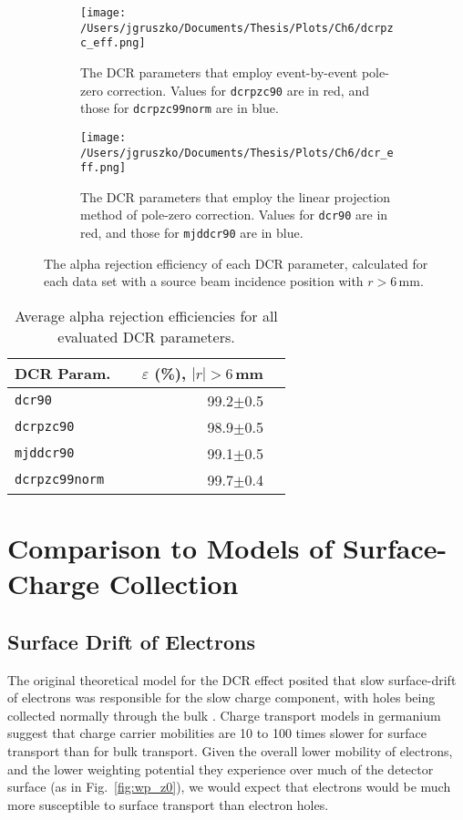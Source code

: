 \begin{figure*}[]
 \centering
 \begin{subfigure}[]{\textwidth}
 \centering
 \texttt{[image: /Users/jgruszko/Documents/Thesis/Plots/Ch6/dcrpzc\_eff.png]}
 \caption{The DCR parameters that employ event-by-event pole-zero correction. Values for {\tt dcrpzc90} are in red, and those for {\tt dcrpzc99norm} are in blue.} 
 \end{subfigure}
 \hfill
  \begin{subfigure}[]{\textwidth}
  \centering
 \texttt{[image: /Users/jgruszko/Documents/Thesis/Plots/Ch6/dcr\_eff.png]}
 \caption{The DCR parameters that employ the linear projection method of pole-zero correction. Values for {\tt dcr90} are in red, and those for {\tt mjddcr90} are in blue.} 
 \end{subfigure}
 \caption[The alpha rejection efficiency as a function of radius for each DCR parameter]{The alpha rejection efficiency of each DCR parameter, calculated for each data set with a source beam incidence position with $r>6$\,mm.}
 \label{fig:eff_allR}
\end{figure*}

\begin{table}[]
\begin{center}
\begin{tabular}{l r r}
DCR Param. & ~~$\varepsilon$ (\%), $|r|>6$\,mm \\  \hline
{\tt dcr90} & 99.2$\pm$0.5  \\
{\tt dcrpzc90} & 98.9$\pm$0.5  \\
{\tt mjddcr90} & 99.1$\pm$0.5  \\
{\tt dcrpzc99norm} &  99.7$\pm$0.4 \\
\end{tabular}
\caption{Average alpha rejection efficiencies for all evaluated DCR parameters.} \label{tab:avgEff}
\end{center}
\end{table}

\section{Comparison to Models of Surface-Charge Collection}
\subsection{Surface Drift of Electrons}
The original theoretical model for the DCR effect posited that slow surface-drift of electrons was responsible for the slow charge component, with holes being collected normally through the bulk \cite{Neutrino16}. Charge transport models in germanium \cite{Mullowney2012} suggest that charge carrier mobilities are 10 to 100 times slower for surface transport than for bulk transport. Given the overall lower mobility of electrons, and the lower weighting potential they experience over much of the detector surface (as in Fig.~\ref{fig:wp_z0}), we would expect that electrons would be much more susceptible to surface transport than electron holes. 

